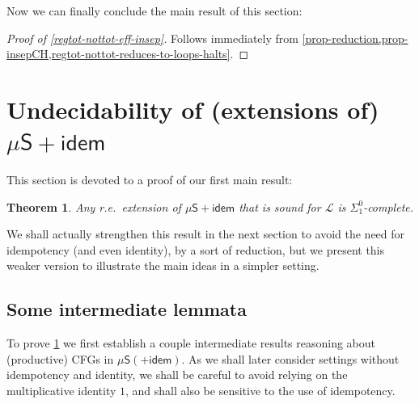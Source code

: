 \documentclass[a4paper,10pt]{amsart}
\newtheorem{theorem}{Theorem}
\theoremstyle{definition}
\newcommand{\Lang}{\mathcal L}
\newcommand{\basicax}{\mu\mathsf{S}}
\newcommand{\idem}{\mathsf{idem}}
\begin{document}
Now we can finally conclude the main result of this section:
\begin{proof}
    [Proof of \cref{regtot-nottot-eff-insep}]
    Follows immediately from \cref{prop-reduction,prop-insepCH,regtot-nottot-reduces-to-loops-halts}.
\end{proof}




\section{Undecidability of (extensions of) $\basicax + \idem$ }
\label{sec:undec-with-idem}

This section is devoted to a proof of our first main result:

\begin{theorem}
\label{thm:undecidability-with-idem}
    Any r.e.\ extension of $\basicax + \idem$ that is sound for $\Lang$ is $\Sigma^0_1$-complete.
\end{theorem}

We shall actually strengthen this result in the next section to avoid the need for idempotency (and even identity), by a sort of reduction, but we present this weaker version to illustrate the main ideas in a simpler setting.


\subsection{Some intermediate lemmata}

To prove \cref{thm:undecidability-with-idem} we first establish a couple intermediate results reasoning about (productive) CFGs in $\basicax (+ \idem)$.
As we shall later consider settings without idempotency and identity, we shall be careful to avoid relying on the multiplicative identity $1$, and shall also be sensitive to the use of idempotency.
\end{document}
